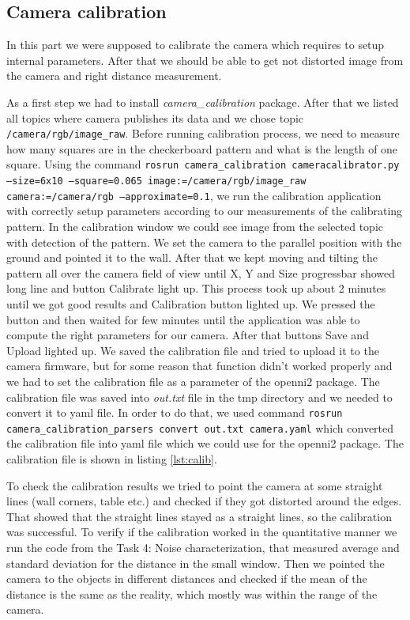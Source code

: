 \documentclass[11pt]{article}
\begin{document}
\subsection{Camera calibration}
	In this part we were supposed to calibrate the camera which requires to setup internal parameters. After that we should be able to get not distorted image from the camera and right distance measurement. \par

	As a first step we had to install \emph{camera\_calibration} package. After that we listed all topics where camera publishes its data and we chose topic \texttt{/camera/rgb/image\_raw}. Before running calibration process, we need to measure how many squares are in the checkerboard pattern and what is the length of one square. Using the command \texttt{rosrun camera\_calibration cameracalibrator.py --size=6x10 --square=0.065 image:=/camera/rgb/image\_raw{ }}\texttt{camera:=/camera/rgb --approximate=0.1}, we run the calibration application with correctly setup parameters according to our measurements of the calibrating pattern. In the calibration window we could see image from the selected topic with detection of the pattern. We set the camera to the parallel position with the ground and pointed it to the wall. After that we kept moving and tilting the pattern all over the camera field of view until X, Y and Size progressbar showed long line and button Calibrate light up. This process took up about 2 minutes until we got good results and Calibration button lighted up. We pressed the button and then waited for few minutes until the application was able to compute the right parameters for our camera. After that buttons Save and Upload lighted up. We saved the calibration file and tried to upload it to the camera firmware, but for some reason that function didn't worked properly and we had to set the calibration file as a parameter of the openni2 package. The calibration file was saved into \emph{out.txt} file in the tmp directory and we needed to convert it to yaml file. In order to do that, we used command \texttt{rosrun camera\_calibration\_parsers convert  out.txt camera.yaml} which converted the calibration file into yaml file which we could use for the openni2 package. The calibration file is shown in listing \vref{lst:calib}. \par
        
	To check the calibration results we tried to point the camera at some straight lines (wall corners, table etc.) and checked if they got distorted around the edges. That showed that the straight lines stayed as a straight lines, so the calibration was successful. To verify if the calibration worked in the quantitative manner we run the code from the Task 4: Noise characterization, that measured average and standard deviation for the distance in the small window. Then we pointed the camera to the objects in different distances and checked if the mean of the distance is the same as the reality, which mostly was within the range of the camera. \par
	
\end{document}
